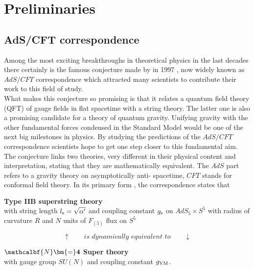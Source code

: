 \chapter{Preliminaries} \label{sec: preleminaries}
\section{AdS/CFT correspondence}
%
%
Among the most exciting breakthroughs in theoretical physics in the last decades there certainly is the famous conjecture made by  in 1997 \cite{maldacena1}, now widely known as $AdS/CFT$ correspondence which attracted many scientists to contribute their work to this field of study.\\
What makes this conjecture so promising is that it relates a quantum field theory (QFT) of gauge fields in flat spacetime with a string theory. The latter one is also a promising candidate for a theory of quantum gravity. Unifying gravity with the other fundamental forces condensed in the Standard Model would be one of the next big milestones in physics. By studying the predictions of the $AdS/CFT$ correspondence scientists hope to get one step closer to this fundamental aim.
The conjecture links two theories, very different in their physical content and interpretation, stating that they are mathematically equivalent.
The $AdS$ part refers to a gravity theory on asymptotically anti- spacetime,  $CFT$ stands for conformal field theory. In its primary form \cite{Ammon:2015wua}, the correspondence states that \\[0.2cm]
%
%
%
\begin{tcolorbox}[colback=white!95!black, colframe=white!90!black]
\begin{center}
\textbf{Type IIB superstring theory} \\
with string length $l_{\rm s}=\sqrt{\alpha'}$ and coupling constant $g_{\rm s}$ on $AdS_{5}\times S^{5}$ with radius of curvature $R$ and $N$ units of $F_{(5)}$ flux on $S^{5}$
\end{center}
\end{tcolorbox}
%
\begin{equation*}
\uparrow \qquad \textit{is dynamically equivalent to} \qquad \downarrow
\end{equation*}\hspace{1mm}
%
%
\begin{tcolorbox}[colback=white!95!black, colframe=white!90!black]
\begin{center}
\textbf{$\mathcalbf{N}\bm{=}\mathbf{4}$ Super  theory}\\
with gauge group $SU(N)$ and  coupling constant $g_{\rm YM}$.
\end{center}
\end{tcolorbox}
